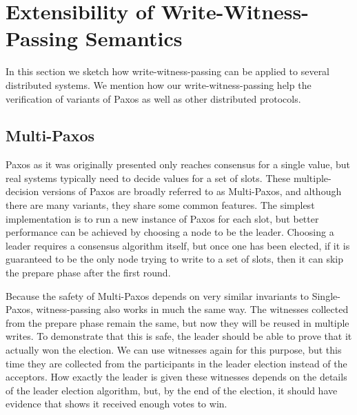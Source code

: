 \section{Extensibility of Write-Witness-Passing Semantics}
\label{sec:witness-passing-semantics-with-paxos-variants}
In this section we sketch how write-witness-passing can be applied to several distributed systems.
We mention how our write-witness-passing help the verification of variants of Paxos as well as other distributed protocols.

\subsection{Multi-Paxos}
\label{subsec:multi-paxos}
Paxos as it was originally presented only reaches consensus for a single value, but real systems
typically need to decide values for a set of slots.
These multiple-decision versions of Paxos are broadly referred to as Multi-Paxos, and although there
are many variants, they share some common features.
The simplest implementation is to run a new instance of Paxos for each slot, but better performance
can be achieved by choosing a node to be the leader.
Choosing a leader requires a consensus algorithm itself, but once one has been elected, if it is
guaranteed to be the only node trying to write to a set of slots, then it can skip the prepare phase after the
first round.

Because the safety of Multi-Paxos depends on very similar invariants to Single-Paxos, witness-passing
also works in much the same way.
The witnesses collected from the prepare phase remain the same, but now they will be reused in multiple
writes.
To demonstrate that this is safe, the leader should be able to prove that it actually won the election.
We can use witnesses again for this purpose, but this time they are collected from the participants in the
leader election instead of the acceptors.
How exactly the leader is given these witnesses depends on the details of the leader election algorithm,
but, by the end of the election, it should have evidence that shows it received enough votes to win.

